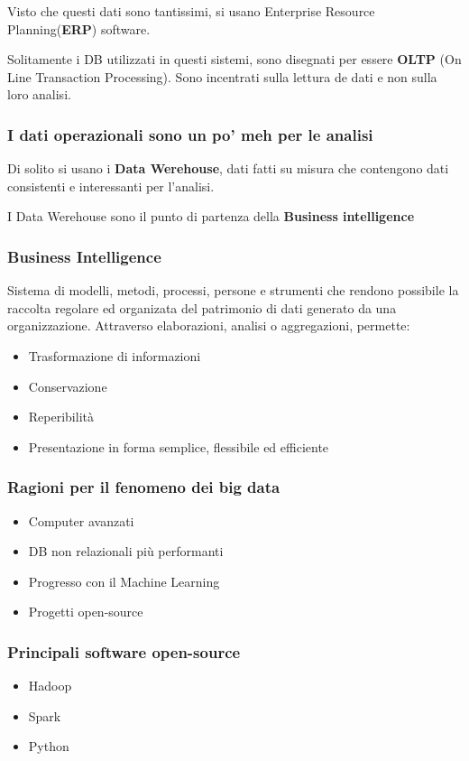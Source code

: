 Visto che questi dati sono tantissimi, si usano Enterprise Resource Planning(\textbf{ERP}) software.

Solitamente i DB utilizzati in questi sistemi, sono disegnati per essere \textbf{OLTP}
(On Line Transaction Processing).
Sono incentrati sulla lettura de dati e non sulla loro analisi.

\subsubsection{I dati operazionali sono un po' meh per le analisi}
Di solito si usano i \textbf{Data Werehouse}, dati fatti su misura che contengono dati consistenti e interessanti per l'analisi.


I Data Werehouse sono il punto di partenza della \textbf{Business intelligence}

\subsubsection{Business Intelligence}
Sistema di modelli, metodi, processi, persone e strumenti che rendono possibile la raccolta regolare ed organizata del patrimonio
di dati generato da una organizzazione.
Attraverso elaborazioni, analisi o aggregazioni, permette:
\begin{itemize}
    \item Trasformazione di informazioni
    \item Conservazione
    \item Reperibilità
    \item Presentazione in forma semplice, flessibile ed efficiente
\end{itemize}

\subsubsection{Ragioni per il fenomeno dei big data}
\begin{itemize}
    \item Computer avanzati
    \item DB non relazionali più performanti
    \item Progresso con il Machine Learning
    \item Progetti open-source
\end{itemize}
\subsubsection{Principali software open-source}
\begin{itemize}
    \item Hadoop
    \item Spark
    \item Python
\end{itemize}

